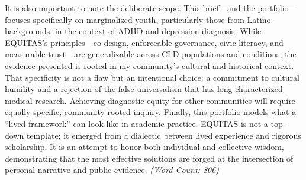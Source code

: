 \documentclass[11pt,twoside]{article}
\begin{document}
It is also important to note the deliberate scope. This brief—and the portfolio—focuses specifically on marginalized youth, particularly those from Latino backgrounds, in the context of ADHD and depression diagnosis. While EQUITAS’s principles—co-design, enforceable governance, civic literacy, and measurable trust—are generalizable across CLD populations and conditions, the evidence presented is rooted in my community’s cultural and historical context. That specificity is not a flaw but an intentional choice: a commitment to cultural humility and a rejection of the false universalism that has long characterized medical research. Achieving diagnostic equity for other communities will require equally specific, community-rooted inquiry. Finally, this portfolio models what a “lived framework” can look like in academic practice. EQUITAS is not a top-down template; it emerged from a dialectic between lived experience and rigorous scholarship. It is an attempt to honor both individual and collective wisdom, demonstrating that the most effective solutions are forged at the intersection of personal narrative and public evidence. \textit{(Word Count: 806)}
\end{document}
